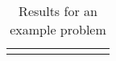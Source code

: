 \begin{center}
\begin{longtable}{ c c c c c c c c }
\caption{Results for an example problem} \\
\label{linear_pathological_results}
\end{longtable}
\end{center}
\normalsize



